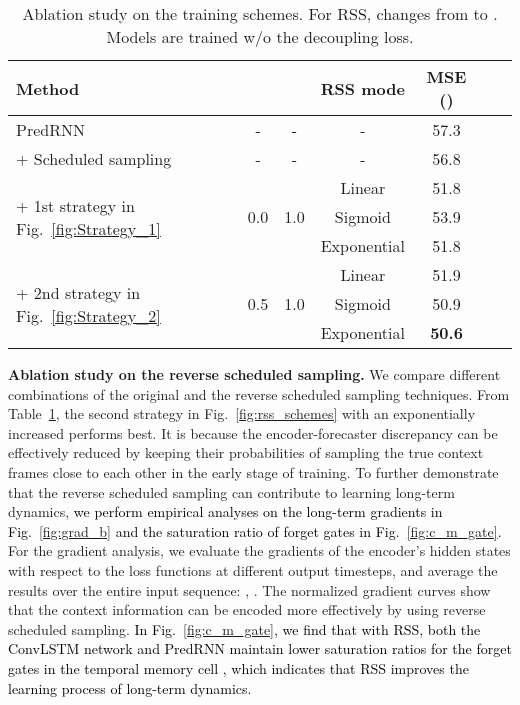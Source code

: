 \documentclass[10pt,journal,compsoc]{IEEEtran}
\newcommand{\tab}[1]{Table~\ref{#1}}
\newcommand{\fig}[1]{Fig.~\ref{#1}}
\newcommand{\revise}[1]{{\textcolor{black}{#1}}}
\newcommand{\myparagraph}[1]{\vspace{5pt} \noindent \textbf{#1.}}
\begin{document}
\begin{table}[t]
\vskip 0.05in
  \caption{Ablation study on the training schemes. For RSS,  changes from  to . Models are trained w/o the decoupling loss.}
  \vskip -0.05in
  \label{tab:mnist_rss}
  \centering
  \begin{tabular}{lcccccc}
    \toprule
    Method &  &  & RSS mode & MSE () \\
    \midrule
    PredRNN & - & - & - & 57.3 \\
    + Scheduled sampling \cite{bengio2015scheduled} & - & - & - & 56.8 \\
    \midrule
    \multirow{3}{*}{+ 1st strategy in \fig{fig:Strategy_1}} & \multirow{3}{*}{0.0} & \multirow{3}{*}{1.0} & Linear & 51.8 \\
     &  &  & Sigmoid & 53.9 \\
     &  &  & Exponential & 51.8 \\
    \midrule
    \multirow{3}{*}{+ 2nd strategy in \fig{fig:Strategy_2}} & \multirow{3}{*}{0.5} & \multirow{3}{*}{1.0} & Linear & 51.9 \\
     &  &  & Sigmoid & 50.9 \\
     &  &  & Exponential & \textbf{50.6} \\
    \bottomrule
  \end{tabular}
  \vspace{-10pt}
\end{table}


\myparagraph{Ablation study on the reverse scheduled sampling}
We compare different combinations of the original and the reverse scheduled sampling techniques.
From \tab{tab:mnist_rss}, the second strategy in \fig{fig:rss_schemes} with an exponentially increased  performs best. It is because the encoder-forecaster discrepancy can be effectively reduced by keeping their probabilities of sampling the true context frames close to each other in the early stage of training.
To further demonstrate that the reverse scheduled sampling can contribute to learning long-term dynamics, \revise{we perform empirical analyses on the long-term gradients in \fig{fig:grad_b} and the saturation ratio of forget gates in \fig{fig:c_m_gate}.}
For the gradient analysis, we evaluate the gradients of the encoder's hidden states with respect to the loss functions at different output timesteps, and average the results over the entire input sequence: , .
The normalized gradient curves show that the context information can be encoded more effectively by using reverse scheduled sampling.
\revise{In \fig{fig:c_m_gate}, we find that with RSS, both the ConvLSTM network and PredRNN maintain lower saturation ratios for the forget gates in the temporal memory cell , which indicates that RSS improves the learning process of long-term dynamics.
}
\end{document}
